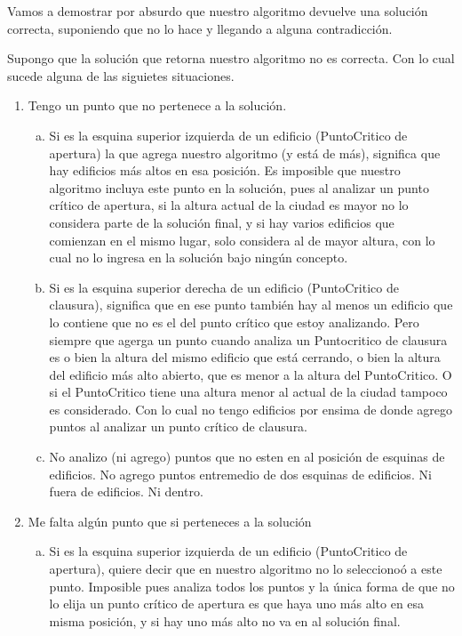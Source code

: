 Vamos a demostrar por absurdo que nuestro algoritmo devuelve una soluci\'on correcta, suponiendo que no lo hace y llegando a alguna contradicci\'on.

Supongo que la soluci\'on que retorna nuestro algoritmo no es correcta. Con lo cual sucede alguna de las siguietes situaciones.

\begin{enumerate}[I]
	\item Tengo un punto que no pertenece a la soluci\'on.
	\begin{enumerate}[(a)]
		\item Si es la esquina superior izquierda de un edificio (PuntoCritico de apertura) la que agrega nuestro algoritmo (y est\'a de m\'as), significa que hay edificios m\'as altos en esa posici\'on. Es imposible que nuestro algoritmo incluya este punto en la soluci\'on, pues al analizar un punto cr\'itico de apertura, si la altura actual de la ciudad es mayor no lo considera parte de la soluci\'on final, y si hay varios edificios que comienzan en el mismo lugar, solo considera al de mayor altura, con lo cual no lo ingresa en la soluci\'on bajo ning\'un concepto.
		\item Si es la esquina superior derecha de un edificio (PuntoCritico de clausura), significa que en ese punto tambi\'en hay al menos un edificio que lo contiene que no es el del punto cr\'itico que estoy analizando. Pero siempre que agerga un punto cuando analiza un Puntocritico de clausura es o bien la altura del mismo edificio que est\'a cerrando, o bien la altura del edificio m\'as alto abierto, que es menor a la altura del PuntoCritico. O si el PuntoCritico tiene una altura menor al actual de la ciudad tampoco es considerado. Con lo cual no tengo edificios por ensima de donde agrego puntos al analizar un punto cr\'itico de clausura.
		\item No analizo (ni agrego) puntos que no esten en al posici\'on de esquinas de edificios. No agrego puntos entremedio de dos esquinas de edificios. Ni fuera de edificios. Ni dentro.
	\end{enumerate}
	\item Me falta alg\'un punto que si perteneces a la soluci\'on
	\begin{enumerate}[(a)]
		\item Si es la esquina superior izquierda de un edificio (PuntoCritico de apertura), quiere decir que en nuestro algoritmo no lo selecciono\'o a este punto. Imposible pues analiza todos los puntos y la \'unica forma de que no lo elija un punto cr\'itico de apertura es que haya uno m\'as alto en esa misma posici\'on, y si hay uno m\'as alto no va en al soluci\'on final.

\end{enumerate}
\end{enumerate}
